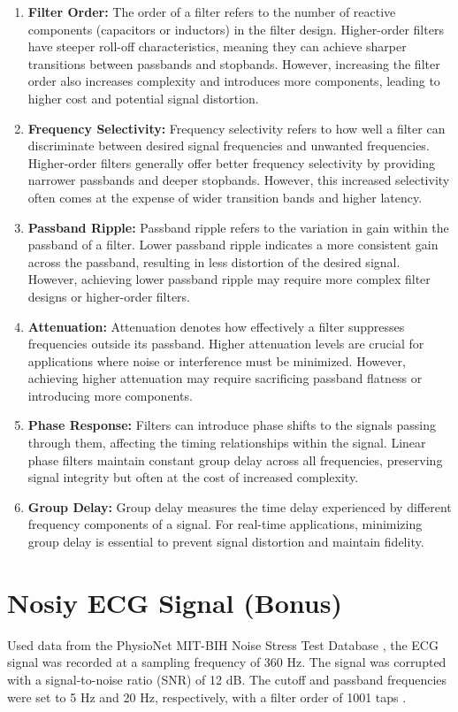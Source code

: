 \documentclass{zc-ust-hw}
\begin{document}
\begin{enumerate}
  \item \textbf{Filter Order:} The order of a filter refers to the number of
    reactive components (capacitors or inductors) in the filter design.
    Higher-order filters have steeper roll-off characteristics, meaning they
    can achieve sharper transitions between passbands and stopbands. However,
    increasing the filter order also increases complexity and introduces more
    components, leading to higher cost and potential signal distortion.
  \item \textbf{Frequency Selectivity:} Frequency selectivity refers to how
    well a filter can discriminate between desired signal frequencies and
    unwanted frequencies. Higher-order filters generally offer better frequency
    selectivity by providing narrower passbands and deeper stopbands. However,
    this increased selectivity often comes at the expense of wider transition
    bands and higher latency.
  \item \textbf{Passband Ripple:} Passband ripple refers to the variation in
    gain within the passband of a filter. Lower passband ripple indicates a
    more consistent gain across the passband, resulting in less distortion of
    the desired signal. However, achieving lower passband ripple may require
    more complex filter designs or higher-order filters.
  \item \textbf{Attenuation:} Attenuation denotes how effectively a filter
    suppresses frequencies outside its passband. Higher attenuation levels are
    crucial for applications where noise or interference must be minimized.
    However, achieving higher attenuation may require sacrificing passband
    flatness or introducing more components.
  \item \textbf{Phase Response:} Filters can introduce phase shifts to the
    signals passing through them, affecting the timing relationships within the
    signal. Linear phase filters maintain constant group delay across all
    frequencies, preserving signal integrity but often at the cost of increased
    complexity.
  \item \textbf{Group Delay:} Group delay measures the time delay experienced
    by different frequency components of a signal. For real-time applications,
    minimizing group delay is essential to prevent signal distortion and
    maintain fidelity.
\end{enumerate}

\section{Nosiy ECG Signal (Bonus)}
Used data from the PhysioNet MIT-BIH Noise Stress Test Database
\cite{goldberger2000physiobank}, the ECG signal was recorded at a sampling
frequency of 360 Hz. The signal was corrupted with a signal-to-noise ratio
(SNR) of 12 dB. The cutoff and passband frequencies were set to 5 Hz and 20 Hz,
respectively, with a filter order of 1001 taps \cite{marchon2019efficient}.
\end{document}

